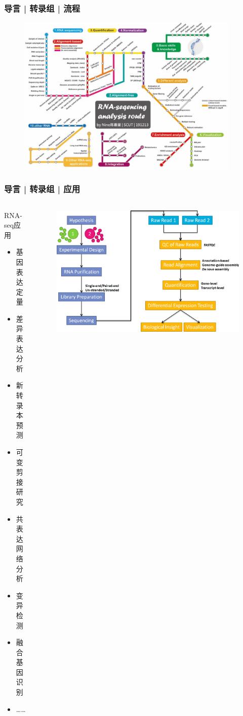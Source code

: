 \documentclass[11pt]{ctexbeamer}
\begin{document}
\begin{frame}
  \frametitle{导言 | 转录组 | 流程}
  \begin{figure}
    \centering
    \includegraphics[width=0.95\textwidth]{RNAseq_route.png}
  \end{figure}
\end{frame}
\begin{frame}
  \frametitle{导言 | 转录组 | 应用}
  \begin{columns}
      \begin{block}{RNA-seq应用}
        \begin{itemize}
          \item 基因表达定量
          \item \alert{差异表达分析}
          \item 新转录本预测
          \item 可变剪接研究
          \item 共表达网络分析
          \item 变异检测
          \item 融合基因识别
          \item ……
        \end{itemize}
      \end{block}
  \begin{figure}
    \centering
    \includegraphics[width=\textwidth]{RNAseq_DEG.png}
  \end{figure}
  \end{columns}
\end{frame}
\end{document}
